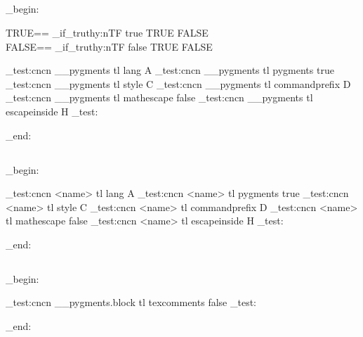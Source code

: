 \subsection{}
\ExplSyntaxOn
\group_begin:

TRUE==
\CDR_if_truthy:nTF { true } {
  TRUE
} {
  FALSE
}\\
FALSE==
\CDR_if_truthy:nTF { false } {
  TRUE
} {
  FALSE
}\\


\CDR_test:cncn { __pygments } { tl } { lang } { A }
\CDR_test:cncn { __pygments } { tl } { pygments } { true }
\CDR_test:cncn { __pygments } { tl } { style } { C }
\CDR_test:cncn { __pygments } { tl } { commandprefix } { D }
\CDR_test:cncn { __pygments } { tl } { mathescape } { false }
\CDR_test:cncn { __pygments } { tl } { escapeinside } { H }
\CDR_test:

\group_end:
\ExplSyntaxOff

\subsection{}
\ExplSyntaxOn
\group_begin:
{}

\CDR_test:cncn { <name> } { tl } { lang } { A }
\CDR_test:cncn { <name> } { tl } { pygments } { true }
\CDR_test:cncn { <name> } { tl } { style } { C }
\CDR_test:cncn { <name> } { tl } { commandprefix } { D }
\CDR_test:cncn { <name> } { tl } { mathescape } { false }
\CDR_test:cncn { <name> } { tl } { escapeinside } { H }
\CDR_test:

\group_end:
\ExplSyntaxOff

\subsection{}
\ExplSyntaxOn
\group_begin:


\CDR_test:cncn { __pygments.block } { tl } { texcomments} { false }
\CDR_test:

\group_end:
\ExplSyntaxOff

